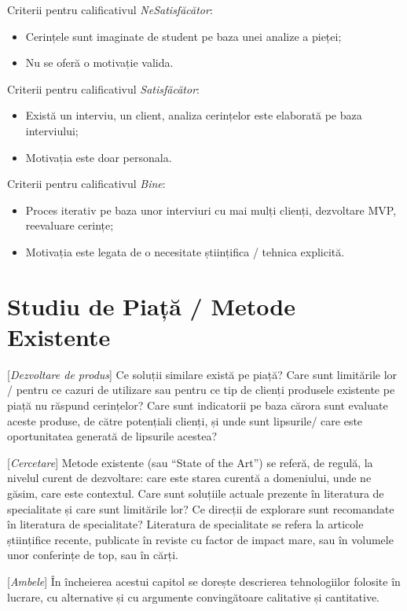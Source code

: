 \documentclass[12pt,a4paper]{report}
\newcommand{\worktype}[1]{[\textit{#1}] }
\newcommand{\dezvoltare}{\worktype{Dezvoltare de produs}}
\newcommand{\cercetare}{\worktype{Cercetare}}
\newcommand{\ambele}{\worktype{Ambele}}
\begin{document}
Criterii pentru calificativul \textit{Ne\textit{Satisfăcător}}:
\begin{itemize}
	\item \dezvoltare Cerințele sunt imaginate de student pe baza unei analize a pieței;
	\item \cercetare Nu se oferă o motivație valida.
\end{itemize}

Criterii pentru calificativul \textit{Satisfăcător}:
\begin{itemize}
	\item \dezvoltare Există un interviu, un client, analiza cerințelor este elaborată pe baza interviului;
	\item \cercetare Motivația este doar personala.
\end{itemize}


Criterii pentru calificativul \textit{Bine}:
\begin{itemize}
	\item	 \dezvoltare Proces iterativ pe baza unor interviuri cu mai mulți clienți, dezvoltare MVP, reevaluare cerințe;
	\item	 \cercetare Motivația este legata de o necesitate științifica / tehnica explicită.
\end{itemize}


\chapter{Studiu de Piață / Metode Existente}
\dezvoltare Ce soluții similare există pe piață? Care sunt limitările lor / pentru ce cazuri de utilizare sau pentru ce tip de clienți produsele existente pe piață nu răspund cerințelor? Care sunt indicatorii pe baza cărora sunt evaluate aceste produse, de către potențiali clienți, și unde sunt lipsurile/ care este oportunitatea generată de lipsurile acestea?

\cercetare Metode existente (sau ``State of the Art'') se referă, de regulă, la nivelul curent de dezvoltare: care este starea curentă a domeniului, unde ne găsim, care este contextul. Care sunt soluțiile actuale prezente în literatura de specialitate și care sunt limitările lor? Ce direcții de explorare sunt recomandate în literatura de specialitate? Literatura de specialitate se refera la articole științifice recente, publicate în reviste cu factor de impact mare, sau în volumele unor conferințe de top, sau în cărți.

\ambele În încheierea acestui capitol se dorește descrierea tehnologiilor folosite în lucrare, cu alternative și cu argumente convingătoare calitative și cantitative.
\end{document}
